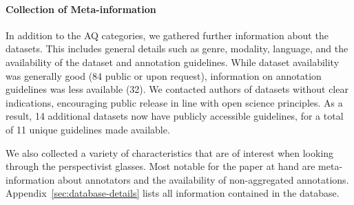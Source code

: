 \paragraph{Collection of Meta-information}
In addition to the AQ categories, we gathered further information about the datasets. This includes general details such as genre, modality, language, and the availability of the dataset and annotation guidelines. While dataset availability was generally good (84 public or upon request), information on annotation guidelines was less available (32). We contacted authors of datasets without clear indications, encouraging public release in line with open science principles. As a result, 14 additional datasets now have publicly accessible guidelines, for a total of 11 unique guidelines made available.

We also collected a variety of characteristics that are of interest when looking through the perspectivist glasses. Most notable for the paper at hand are meta-information about annotators and the availability of non-aggregated annotations. Appendix~\ref{sec:database-details} lists all information contained in the database.